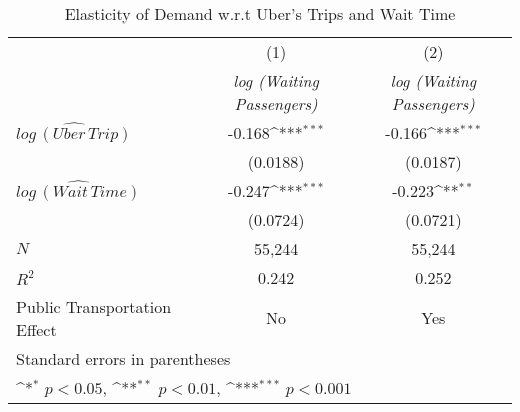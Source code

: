 \begin{table}[h]
\caption{Elasticity of Demand w.r.t Uber's Trips and Wait Time}\label{tab:lnuber_regression}\\

{
\def\sym#1{\ifmmode^{#1}\else\(^{#1}\)\fi}
\begin{center}
\begin{tabular}{l*{2}{c}}
\hline\hline
            &\multicolumn{1}{c}{(1)}&\multicolumn{1}{c}{(2)}\\
             &\multicolumn{1}{c}{\textit{log (Waiting Passengers)}}&\multicolumn{1}{c}{\textit{log (Waiting Passengers)}}\\
\hline
${\widehat{log\, (Uber\,Trip)}}$  &      -0.168\sym{***}&      -0.166\sym{***}\\
            &    (0.0188)         &    (0.0187)         \\
[1em]
${\widehat{log\, (Wait\, Time)}}$&      -0.247\sym{***}&      -0.223\sym{**} \\
            &    (0.0724)         &    (0.0721)         \\
\hline
\(N\)       &       55,244         &       55,244         \\
\(R^{2}\)   &       0.242         &       0.252         \\
Public Transportation Effect &         No            &             Yes        \\
\hline\hline
\multicolumn{3}{l}{\footnotesize Standard errors in parentheses}\\
\multicolumn{3}{l}{\footnotesize \sym{*} \(p<0.05\), \sym{**} \(p<0.01\), \sym{***} \(p<0.001\)}\\
\end{tabular}
\end{center}
}


\end{table}
